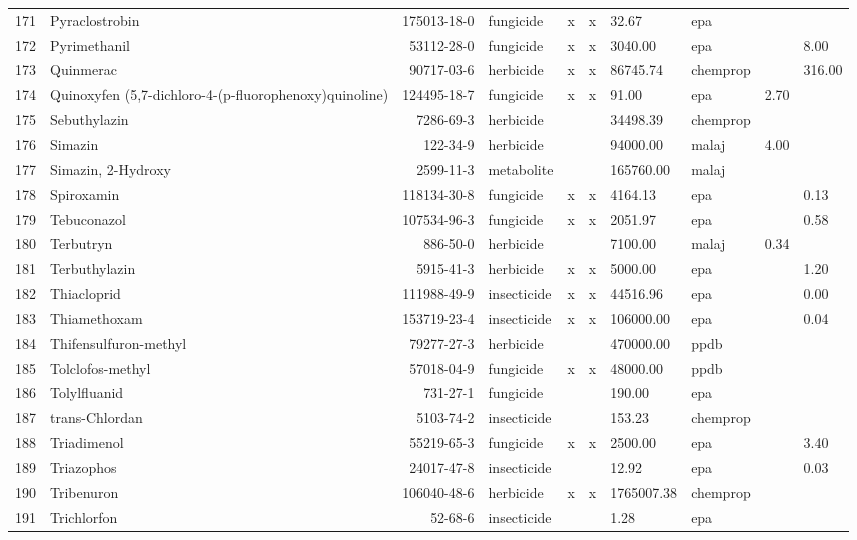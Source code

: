 \begin{longtable}{lp{3cm}rlp{0.5cm}p{0.5cm}p{1cm}p{1cm}p{1cm}p{1cm}}
  171 & Pyraclostrobin & 175013-18-0 & fungicide & x & x & 32.67 & epa &  &  \\ 
  172 & Pyrimethanil & 53112-28-0 & fungicide & x & x & 3040.00 & epa &  & 8.00 \\ 
  173 & Quinmerac & 90717-03-6 & herbicide & x & x & 86745.74 & chemprop &  & 316.00 \\ 
  174 & Quinoxyfen (5,7-dichloro-4-(p-fluorophenoxy)quinoline) & 124495-18-7 & fungicide & x & x & 91.00 & epa & 2.70 &  \\ 
  175 & Sebuthylazin & 7286-69-3 & herbicide &  &  & 34498.39 & chemprop &  &  \\ 
  176 & Simazin & 122-34-9 & herbicide &  &  & 94000.00 & malaj & 4.00 &  \\ 
  177 & Simazin, 2-Hydroxy & 2599-11-3 & metabolite &  &  & 165760.00 & malaj &  &  \\ 
  178 & Spiroxamin & 118134-30-8 & fungicide & x & x & 4164.13 & epa &  & 0.13 \\ 
  179 & Tebuconazol & 107534-96-3 & fungicide & x & x & 2051.97 & epa &  & 0.58 \\ 
  180 & Terbutryn & 886-50-0 & herbicide &  &  & 7100.00 & malaj & 0.34 &  \\ 
  181 & Terbuthylazin & 5915-41-3 & herbicide & x & x & 5000.00 & epa &  & 1.20 \\ 
  182 & Thiacloprid & 111988-49-9 & insecticide & x & x & 44516.96 & epa &  & 0.00 \\ 
  183 & Thiamethoxam & 153719-23-4 & insecticide & x & x & 106000.00 & epa &  & 0.04 \\ 
  184 & Thifensulfuron-methyl & 79277-27-3 & herbicide &  &  & 470000.00 & ppdb &  &  \\ 
  185 & Tolclofos-methyl & 57018-04-9 & fungicide & x & x & 48000.00 & ppdb &  &  \\ 
  186 & Tolylfluanid & 731-27-1 & fungicide &  &  & 190.00 & epa &  &  \\ 
  187 & trans-Chlordan & 5103-74-2 & insecticide &  &  & 153.23 & chemprop &  &  \\ 
  188 & Triadimenol & 55219-65-3 & fungicide & x & x & 2500.00 & epa &  & 3.40 \\ 
  189 & Triazophos & 24017-47-8 & insecticide &  &  & 12.92 & epa &  & 0.03 \\ 
  190 & Tribenuron & 106040-48-6 & herbicide & x & x & 1765007.38 & chemprop &  &  \\ 
  191 & Trichlorfon & 52-68-6 & insecticide &  &  & 1.28 & epa &  &  \\ 

\end{longtable}
